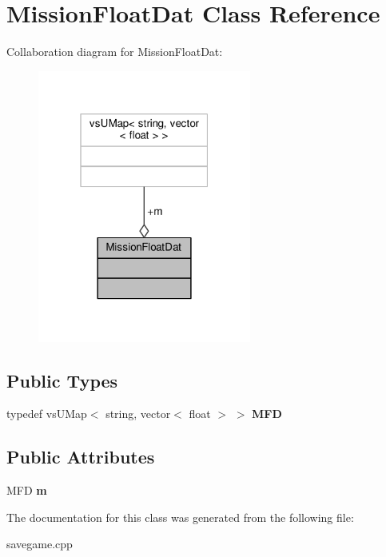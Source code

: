 \hypertarget{classMissionFloatDat}{}\section{Mission\+Float\+Dat Class Reference}
\label{classMissionFloatDat}


Collaboration diagram for Mission\+Float\+Dat\+:
\nopagebreak
\begin{figure}[H]
\begin{center}
\leavevmode
\includegraphics[width=199pt]{d0/d64/classMissionFloatDat__coll__graph}
\end{center}
\end{figure}
\subsection*{Public Types}
\begin{DoxyCompactItemize}
\item 
typedef vs\+U\+Map$<$ string, vector$<$ float $>$ $>$ {\bfseries M\+FD}\hypertarget{classMissionFloatDat_a7a719962646fc3b40bbde7de251a645c}{}\label{classMissionFloatDat_a7a719962646fc3b40bbde7de251a645c}

\end{DoxyCompactItemize}
\subsection*{Public Attributes}
\begin{DoxyCompactItemize}
\item 
M\+FD {\bfseries m}\hypertarget{classMissionFloatDat_a64ca9d02276da4892c622d09cdf6b5af}{}\label{classMissionFloatDat_a64ca9d02276da4892c622d09cdf6b5af}

\end{DoxyCompactItemize}


The documentation for this class was generated from the following file\+:\begin{DoxyCompactItemize}
\item 
savegame.\+cpp\end{DoxyCompactItemize}
